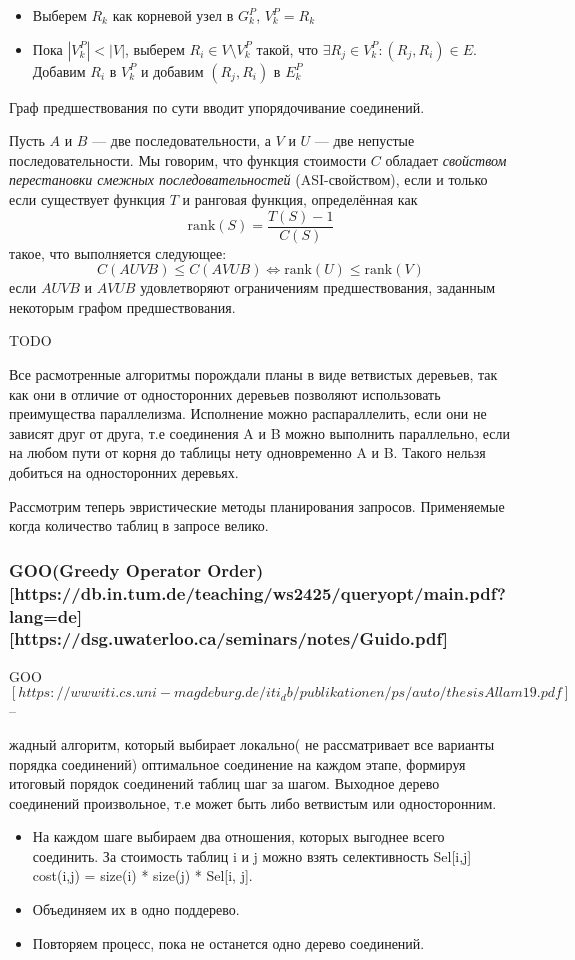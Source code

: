 \documentclass[12pt]{article}
\begin{document}
\begin{flushleft}
\begin{itemize}
    \item Выберем $R_k$ как корневой узел в $G^{P}_k$, $V^{P}_k = {R_k}$
    \item Пока $|V^{P}_k| < |V|$, выберем 
    $R_i \in V \setminus V^{P}_k$ такой, что $\exists R_j \in V^{P}_k : (R_j, R_i) \in E$.
    Добавим $R_i$ в $V^{P}_k$ и добавим $(R_j, R_i)$ в $E^{P}_k$
\end{itemize}

Граф предшествования по сути вводит упорядочивание соединений.

Пусть $A$ и $B$ — две последовательности, а $V$ и $U$ — две непустые последовательности.  
Мы говорим, что функция стоимости $C$ обладает \textit{свойством перестановки смежных последовательностей}  
(ASI-свойством), если и только если существует функция $T$ и ранговая функция, определённая как  
\[
\text{rank}(S) = \frac{T(S) - 1}{C(S)}
\]
такое, что выполняется следующее:
\[
C(AUVB) \leq C(AVUB) \iff \text{rank}(U) \leq \text{rank}(V)
\]
если $AUVB$ и $AVUB$ удовлетворяют ограничениям предшествования,  
заданным некоторым графом предшествования.

\centering TODO

Все расмотренные алгоритмы порождали планы в виде ветвистых деревьев, так как они 
в отличие от односторонних деревьев позволяют использовать преимущества параллелизма.
Исполнение можно распараллелить, если они не зависят друг от друга, т.е 
соединения A и B можно выполнить параллельно, если на любом пути от корня 
до таблицы нету одновременно A и B. Такого нельзя добиться на односторонних 
деревьях.


Рассмотрим теперь эвристические методы планирования запросов. Применяемые когда количество
таблиц в запросе велико.

\centering \subsubsection*{GOO(Greedy Operator Order) [https://db.in.tum.de/teaching/ws2425/queryopt/main.pdf?lang=de][https://dsg.uwaterloo.ca/seminars/notes/Guido.pdf]}
\raggedright

GOO $[https://wwwiti.cs.uni-magdeburg.de/iti_db/publikationen/ps/auto/thesisAllam19.pdf ]$ -- 

жадный алгоритм, который выбирает локально( не рассматривает все  варианты порядка соединений) 
оптимальное соединение на каждом этапе, формируя 
итоговый порядок соединений таблиц шаг за шагом. Выходное
дерево соединений произвольное, т.е может быть либо ветвистым или односторонним.
\begin{itemize}
    \item На каждом шаге выбираем два отношения, которых выгоднее всего соединить. За стоимость таблиц i и j можно взять селективность Sel[i,j]
    cost(i,j) = size(i) * size(j) * Sel[i, j].
    \item Объединяем их в одно поддерево.
    \item Повторяем процесс, пока не останется одно дерево соединений.
\end{itemize}


\end{flushleft}
\end{document}
